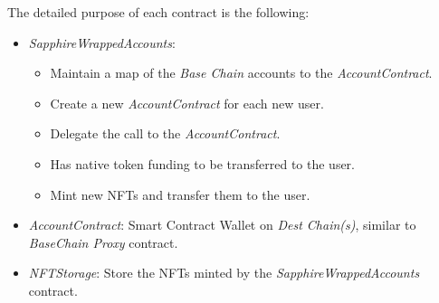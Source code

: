 The detailed purpose of each contract is the following:
\begin{itemize}
    \item \textit{SapphireWrappedAccounts}: 
        \begin{itemize}
            \item Maintain a map of the \textit{Base Chain} accounts to the \textit{AccountContract}. 
            \item Create a new \textit{AccountContract} for each new user.
            \item Delegate the call to the \textit{AccountContract}.
            \item Has native token funding to be transferred to the user. 
            \item Mint new NFTs and transfer them to the user.
        \end{itemize}
    \item \textit{AccountContract}: Smart Contract Wallet on \textit{Dest Chain(s)}, similar to \textit{BaseChain Proxy} contract.
    \item \textit{NFTStorage}: Store the NFTs minted by the \textit{SapphireWrappedAccounts} contract.
\end{itemize}